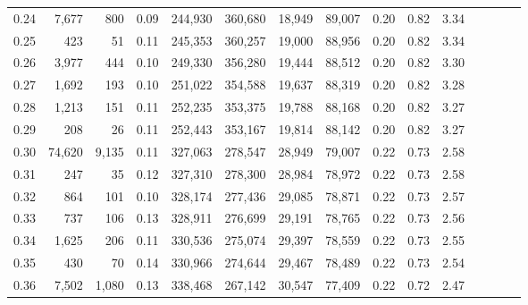 \begin{tabular}{rrrcrrrrrrrrrrr}
0.24 &   7,677 &     800 &                                       0.09 &  244,930 &  360,680 &   18,949 &   89,007 &  0.20 &  0.82 &                         3.34 \\
0.25 &     423 &      51 &                                       0.11 &  245,353 &  360,257 &   19,000 &   88,956 &  0.20 &  0.82 &                         3.34 \\
0.26 &   3,977 &     444 &                                       0.10 &  249,330 &  356,280 &   19,444 &   88,512 &  0.20 &  0.82 &                         3.30 \\
0.27 &   1,692 &     193 &                                       0.10 &  251,022 &  354,588 &   19,637 &   88,319 &  0.20 &  0.82 &                         3.28 \\
0.28 &   1,213 &     151 &                                       0.11 &  252,235 &  353,375 &   19,788 &   88,168 &  0.20 &  0.82 &                         3.27 \\
0.29 &     208 &      26 &                                       0.11 &  252,443 &  353,167 &   19,814 &   88,142 &  0.20 &  0.82 &                         3.27 \\
0.30 &  74,620 &   9,135 &                                       0.11 &  327,063 &  278,547 &   28,949 &   79,007 &  0.22 &  0.73 &                         2.58 \\
0.31 &     247 &      35 &                                       0.12 &  327,310 &  278,300 &   28,984 &   78,972 &  0.22 &  0.73 &                         2.58 \\
0.32 &     864 &     101 &                                       0.10 &  328,174 &  277,436 &   29,085 &   78,871 &  0.22 &  0.73 &                         2.57 \\
0.33 &     737 &     106 &                                       0.13 &  328,911 &  276,699 &   29,191 &   78,765 &  0.22 &  0.73 &                         2.56 \\
0.34 &   1,625 &     206 &                                       0.11 &  330,536 &  275,074 &   29,397 &   78,559 &  0.22 &  0.73 &                         2.55 \\
0.35 &     430 &      70 &                                       0.14 &  330,966 &  274,644 &   29,467 &   78,489 &  0.22 &  0.73 &                         2.54 \\
0.36 &   7,502 &   1,080 &                                       0.13 &  338,468 &  267,142 &   30,547 &   77,409 &  0.22 &  0.72 &                         2.47 \\

\end{tabular}
